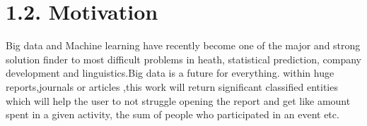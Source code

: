 \section*{1.2. Motivation}
Big data and Machine learning have recently become one of the major and strong solution finder to most difficult problems in heath, statistical prediction, company development and linguistics.Big data is a future for everything.
within huge reports,journals or articles ,this work will return significant  classified entities which will help the user to not struggle opening the report and get like amount spent in a given activity, the sum of people who participated in an event etc.




%
% 

